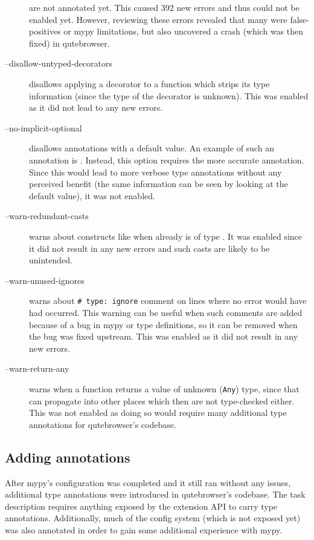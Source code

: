\begin{description}
    are not annotated yet. This caused 392 new errors and thus could not be
    enabled yet. However, reviewing these errors revealed that many were
    false-positives or mypy limitations, but also uncovered a crash (which was
    then fixed) in qutebrowser.
  \item[--disallow-untyped-decorators] disallows applying a decorator to a
    function which strips its type information (since the type of the decorator
    is unknown). This was enabled as it did not lead to any new errors.
  \item[--no-implicit-optional] disallows annotations with a  default
    value. An example of such an annotation is .
    Instead, this option requires the more accurate 
    annotation. Since this would lead to more verbose type annotations without any
    perceived benefit (the same information can be seen by looking at the default
    value), it was not enabled.
  \item[--warn-redundant-casts] warns about constructs like  when  already is of type . It was enabled since it
    did not result in any new errors and such casts are likely to be unintended.
  \item[--warn-unused-ignores] warns about \texttt{# type: ignore}
    comment on lines where no error would have had occurred. This warning can
    be useful when such comments are added because of a bug in mypy or type
    definitions, so it can be removed when the bug was fixed upstream.
    This was enabled as it did not result in any new errors.
  \item[--warn-return-any] warns when a function returns a value of unknown
    (\verb|Any|) type, since that can propagate into other places which then are
    not type-checked either. This was not enabled as doing so would require many
    additional type annotations for qutebrowser's codebase.
\end{description}

\subsection{Adding annotations}

After mypy's configuration was completed and it still ran without any issues,
additional type annotations were introduced in qutebrowser's codebase. The task
description requires anything exposed by the extension API to carry type
annotations. Additionally, much of the config system (which is not exposed yet)
was also annotated in order to gain some additional experience with mypy.

